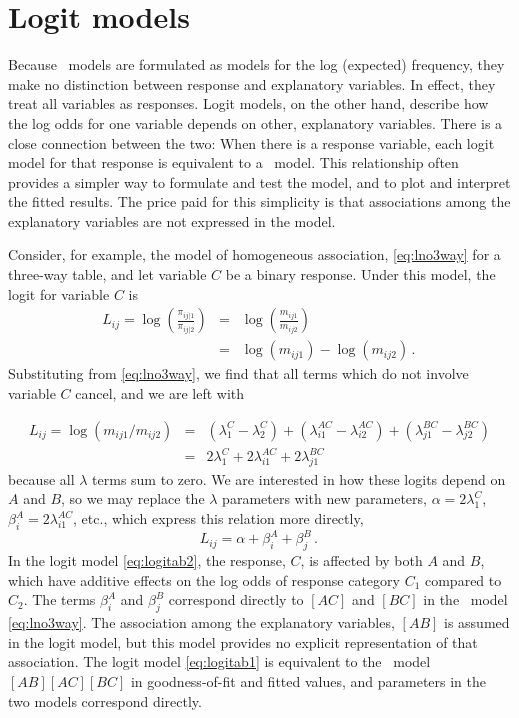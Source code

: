 \section{Logit models}\label{sec:loglin-logit}
Because \loglin\ models are  formulated as models for the
log (expected) frequency, they make no distinction between
response and explanatory variables.
In effect, they treat all variables as responses.
Logit models, on the other hand,
describe how the log odds for one variable depends on other,
explanatory variables.
There is a close connection between the two:
When there is a response variable, each logit model for that response
is equivalent to a \loglin\ model.
This relationship often provides a simpler way to formulate and test
the model, and to plot and interpret the fitted results.
The price paid for this simplicity is that associations among the
explanatory variables are not expressed in the model.

Consider, for example, the model of homogeneous association,
\eqref{eq:lno3way} for a three-way table, and let variable $C$
be a binary response.  Under this model, the logit for variable $C$
is
\begin{eqnarray*}
  L_{ij}  =
  \log \left(  \frac{\pi_{ij|1}}{\pi_{ij|2}} \right) & = &
  \log \left(  \frac{m_{ij1}}{m_{ij2}} \right) \\
    &  = &
  \log (m_{ij1}) - \log (m_{ij2})
  \period
\end{eqnarray*}
Substituting from \eqref{eq:lno3way}, we find that all terms which do not
involve variable $C$ cancel, and we are left with

\begin{eqnarray} \label{eq:logitab1}
  L_{ij}  =
  \log ( m_{ij1} /  m_{ij2} )  & = &
  ( \lambda_1^C - \lambda_2^C )  +
  ( \lambda_{i1}^{AC} - \lambda_{i2}^{AC} )  +
  ( \lambda_{j1}^{BC} - \lambda_{j2}^{BC} )  \nonumber \\
  &  = &
  2 \lambda_1^C   +   2 \lambda_{i1}^{AC} +   2 \lambda_{j1}^{BC}
\end{eqnarray}
because all \(\lambda\) terms sum  to zero.  We are interested in how these
logits depend on $A$ and $B$, so we may replace the $\lambda$ parameters
with new parameters,
 \(\alpha  = 2
\lambda_1^C\), \(\beta _i^A = 2 \lambda_{i1}^{AC}\), etc., which express this relation more directly,
\begin{equation}\label{eq:logitab2}
  L_{ij}  =
  \alpha   +  \beta _i^A +  \beta _j^B
  \period
\end{equation}
In the logit model \eqref{eq:logitab2}, the response, $C$, is affected
by both $A$ and $B$, which have additive effects on the log odds of response
category $C_1$ compared to $C_2$.
The terms $\beta _i^A$ and  $\beta _j^B$
correspond directly to $[AC]$ and $[BC]$ in the \loglin\ model \eqref{eq:lno3way}. The association among the explanatory variables,
$[AB]$ is assumed in the logit model, but this model provides no explicit
representation of that association.  The logit model \eqref{eq:logitab1}
is equivalent to the \loglin\ model $[AB] [AC] [BC]$ in goodness-of-fit
and fitted values, and parameters in the two models correspond directly.

